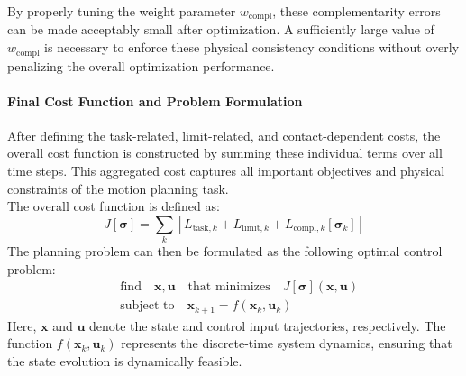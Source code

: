 \documentclass[main.tex]{subfiles}
\begin{document}
By properly tuning the weight parameter $w_{\text{compl}}$, these complementarity errors can be made acceptably small after optimization. A sufficiently large value of $w_{\text{compl}}$ is necessary to enforce these physical consistency conditions without overly penalizing the overall optimization performance.
\paragraph{Final Cost Function and Problem Formulation}
After defining the task-related, limit-related, and contact-dependent costs, the overall cost function is constructed by summing these individual terms over all time steps. This aggregated cost captures all important objectives and physical constraints of the motion planning task.
\\
The overall cost function is defined as:
\begin{equation}
J[\boldsymbol{\sigma}] = \sum_k \left[ L_{\text{task},k} + L_{\text{limit},k} + L_{\text{compl},k}[\boldsymbol{\sigma}_k] \right]
\end{equation}
The planning problem can then be formulated as the following optimal control problem:
\begin{equation}
\begin{aligned}
& \text{find} \quad \mathbf{x}, \mathbf{u} \quad \text{that minimizes} \quad J[\boldsymbol{\sigma}](\mathbf{x},\mathbf{u}) \\
& \text{subject to} \quad \mathbf{x}_{k+1} = f(\mathbf{x}_k, \mathbf{u}_k)
\end{aligned}
\end{equation}
Here, $\mathbf{x}$ and $\mathbf{u}$ denote the state and control input trajectories, respectively. The function $f(\mathbf{x}_k, \mathbf{u}_k)$ represents the discrete-time system dynamics, ensuring that the state evolution is dynamically feasible.
\begin{comment}
This problem is formulated using a \textit{single shooting} approach, where the control inputs are directly optimized and the states are obtained by integrating the system dynamics forward in time. 
Due to the nonlinearities in the cost terms (especially those involving contact forces and constraints) and the system dynamics, the resulting optimization is generally a \textit{nonlinear programming problem} (NLP). However, in certain cases where the dynamics and cost functions are affine and the constraints are quadratic, the problem structure could be approximated as a \textit{quadratic programming} (QP) problem to enable faster computation.
Overall, the optimization simultaneously enforces task tracking, physical feasibility, and complementarity conditions related to contact interactions throughout the planned motion.
\end{comment}
\end{document}
